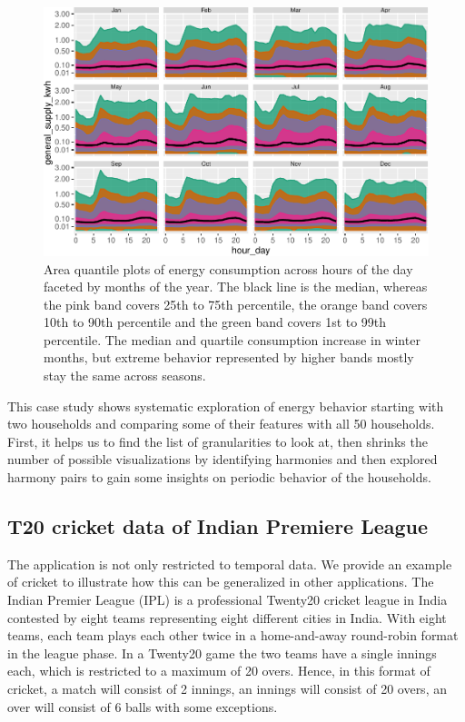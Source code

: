 \documentclass[12pt]{article}
\begin{document}
\begin{figure}

{\centering \includegraphics[width=\textwidth]{figure/my-hd-1} 

}

\caption{Area quantile plots of energy consumption across hours of the day faceted by months of the year. The black line is the median, whereas the pink band covers 25th to 75th percentile, the orange band covers 10th to 90th percentile and the green band covers 1st to 99th percentile. The median and quartile consumption increase in winter months, but extreme behavior represented by higher bands mostly stay the same across seasons. }\label{fig:my-hd}
\end{figure}

This case study shows systematic exploration of energy behavior starting
with two households and comparing some of their features with all 50
households. First, it helps us to find the list of granularities to look
at, then shrinks the number of possible visualizations by identifying
harmonies and then explored harmony pairs to gain some insights on
periodic behavior of the households.

\hypertarget{sec:cricket}{%
\subsection{T20 cricket data of Indian Premiere
League}\label{sec:cricket}}

The application is not only restricted to temporal data. We provide an
example of cricket to illustrate how this can be generalized in other
applications. The Indian Premier League (IPL) is a professional Twenty20
cricket league in India contested by eight teams representing eight
different cities in India. With eight teams, each team plays each other
twice in a home-and-away round-robin format in the league phase. In a
Twenty20 game the two teams have a single innings each, which is
restricted to a maximum of 20 overs. Hence, in this format of cricket, a
match will consist of 2 innings, an innings will consist of 20 overs, an
over will consist of 6 balls with some exceptions.
\end{document}
